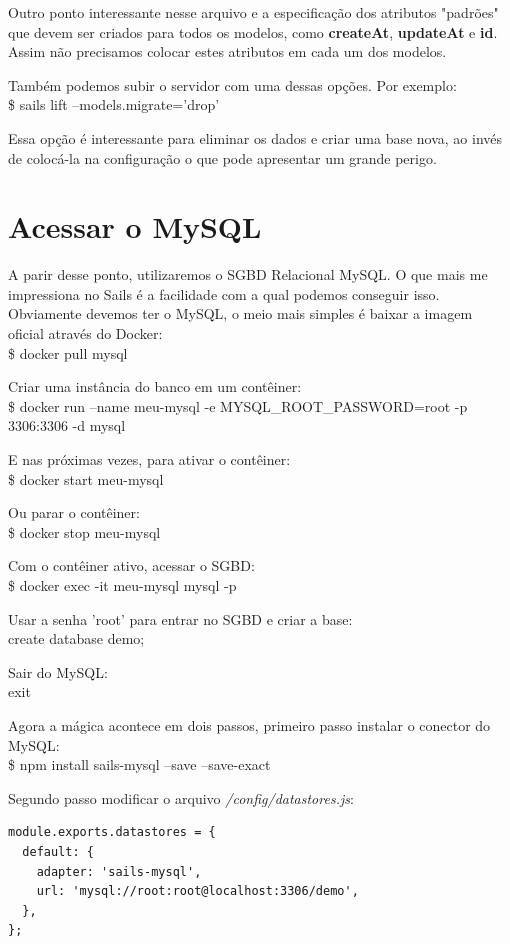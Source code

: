 \documentclass[a4paper,11pt]{article}
\begin{document}
Outro ponto interessante nesse arquivo e a especificação dos atributos "padrões" que devem ser criados para todos os modelos, como \textbf{createAt}, \textbf{updateAt} e \textbf{id}. Assim não precisamos colocar estes atributos em cada um dos modelos. 

Também podemos subir o servidor com uma dessas opções. Por exemplo: \\
{\ttfamily\$ sails lift --models.migrate='drop'}

Essa opção é interessante para eliminar os dados e criar uma base nova, ao invés de colocá-la na configuração o que pode apresentar um grande perigo.
 
\section{Acessar o MySQL}
A parir desse ponto, utilizaremos o SGBD Relacional MySQL. O que mais me impressiona no Sails é a facilidade com a qual podemos conseguir isso. Obviamente devemos ter o MySQL, o meio mais simples é baixar a imagem oficial através do Docker: \\
{\ttfamily\$ docker pull mysql}

Criar uma instância do banco em um contêiner: \\
{\ttfamily\$ docker run --name meu-mysql -e MYSQL\_ROOT\_PASSWORD=root -p 3306:3306 -d mysql}

E nas próximas vezes, para ativar o contêiner: \\
{\ttfamily\$ docker start meu-mysql}

Ou parar o contêiner: \\
{\ttfamily\$ docker stop meu-mysql}

Com o contêiner ativo, acessar o SGBD: \\
{\ttfamily\$ docker exec -it meu-mysql mysql -p}

Usar a senha 'root' para entrar no SGBD e criar a base: \\
{\ttfamily create database demo;}

Sair do MySQL: \\
{\ttfamily exit}

Agora a mágica acontece em dois passos, primeiro passo instalar o conector do MySQL: \\
{\ttfamily\$ npm install sails-mysql --save --save-exact}

Segundo passo modificar o arquivo \textit{/config/datastores.js}:
\begin{lstlisting}
module.exports.datastores = {
  default: {
    adapter: 'sails-mysql',
    url: 'mysql://root:root@localhost:3306/demo',
  },
};
\end{lstlisting}
\end{document}
